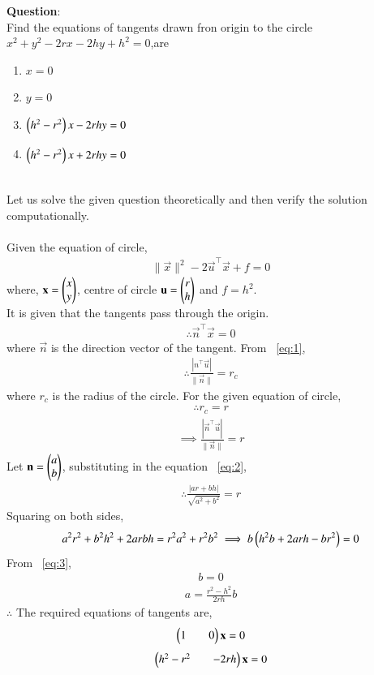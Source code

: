 \documentclass[journal]{IEEEtran}
\begin{document}
\textbf{Question}:\\
Find the equations of tangents drawn fron origin to the circle $x^2+y^2-2rx-2hy+h^2=0$,are
\begin{multicols}{2}
\begin{enumerate}
    \item $x=0$
    \item $y=0$
    \item $\left(h^2-r^2\right)x-2rhy=0$
    \item $\left(h^2-r^2\right)x+2rhy=0$
\end{enumerate}
\end{multicols}
\solution \\
Let us solve the given question theoretically and then verify the solution computationally.\\
\\
Given the equation of circle,
\begin{align}
    \|\vec{x}\|^2-2\vec{u}^{\top}\vec{x}+f=0 \label{eq:1}
\end{align}
where, $\mathbf{x}=\begin{pmatrix}x\\y\end{pmatrix}$, centre of circle $\mathbf{u}=\begin{pmatrix}r\\h\end{pmatrix}$ and $f=h^2$.\\ 
It is given that the tangents pass through the origin.
\begin{align}
    \therefore \vec{n}^{\top}\vec{x}=0
\end{align}
where $\vec{n}$ is the direction vector of the tangent.
From ~\eqref{eq:1},
\begin{align}
    \therefore \frac{|n^{\top}\vec{u}|}{\|\vec{n}\|}=r_c
\end{align}
where $r_c$ is the radius of the circle. For the given equation of circle,
\begin{align}
    \therefore r_c=r
\end{align}
\begin{align}
    \implies \frac{|\vec{n}^{\top}\vec{u}|}{\|\vec{n}\|}=r \label{eq:2}
\end{align}
Let $\mathbf{n}=\begin{pmatrix}a\\b\end{pmatrix}$, substituting in the equation ~\eqref{eq:2},
\begin{align}
    \therefore \frac{|ar+bh|}{\sqrt{a^2+b^2}}=r
\end{align}
Squaring on both sides,
\begin{align}
    a^2r^2+b^2h^2+2arbh=r^2a^2+r^2b^2 \implies b\left(h^2b+2arh-br^2\right)=0
    \label{eq:3}
\end{align}
\newpage
\vspace*{0.25cm}
From ~\eqref{eq:3},
\begin{align}
    b=0
\end{align}
\begin{align}
    a=\frac{r^2-h^2}{2rh}b
\end{align}
$\therefore$ The required equations of tangents are,
\begin{align}
    \begin{pmatrix}1&&0\end{pmatrix}\mathbf{x}=0
\end{align}
\begin{align}
    \begin{pmatrix}h^2-r^2&&-2rh\end{pmatrix}\mathbf{x}=0
\end{align}
\end{document}
